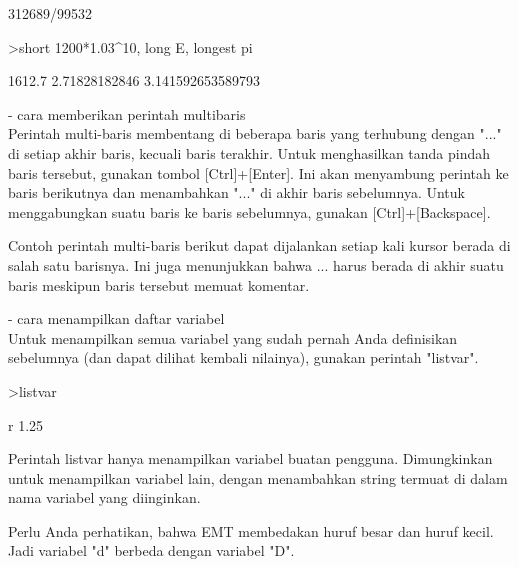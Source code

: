 \documentclass[a4paper,10pt]{article}
\begin{document}
\begin{eulernotebook}
\begin{eulercomment}
\begin{eulercomment}
\begin{euleroutput}
  312689/99532
\end{euleroutput}
\begin{eulerprompt}
>short 1200*1.03^10, long E, longest pi
\end{eulerprompt}
\begin{euleroutput}
  1612.7
  2.71828182846
        3.141592653589793 
\end{euleroutput}
\begin{eulercomment}
- cara memberikan perintah multibaris\\
Perintah multi-baris membentang di beberapa baris yang terhubung
dengan "..." di setiap akhir baris, kecuali baris terakhir. Untuk
menghasilkan tanda pindah baris tersebut, gunakan tombol
[Ctrl]+[Enter]. Ini akan menyambung perintah ke baris berikutnya dan
menambahkan "..." di akhir baris sebelumnya. Untuk menggabungkan suatu
baris ke baris sebelumnya, gunakan [Ctrl]+[Backspace].

Contoh perintah multi-baris berikut dapat dijalankan setiap kali
kursor berada di salah satu barisnya. Ini juga menunjukkan bahwa ...
harus berada di akhir suatu baris meskipun baris tersebut memuat
komentar.
\end{eulercomment}
\begin{eulercomment}
- cara menampilkan daftar variabel\\
Untuk menampilkan semua variabel yang sudah pernah Anda definisikan
sebelumnya (dan dapat dilihat kembali nilainya), gunakan perintah
"listvar".
\end{eulercomment}
\begin{eulerprompt}
>listvar
\end{eulerprompt}
\begin{euleroutput}
  r                   1.25
\end{euleroutput}
\begin{eulercomment}
Perintah listvar hanya menampilkan variabel buatan pengguna.
Dimungkinkan untuk menampilkan variabel lain, dengan menambahkan
string  termuat di dalam nama variabel yang diinginkan.

Perlu Anda perhatikan, bahwa EMT membedakan huruf besar dan huruf
kecil. Jadi variabel "d" berbeda dengan variabel "D".


\end{eulercomment}
\end{eulercomment}
\end{eulercomment}
\end{eulernotebook}
\end{document}
